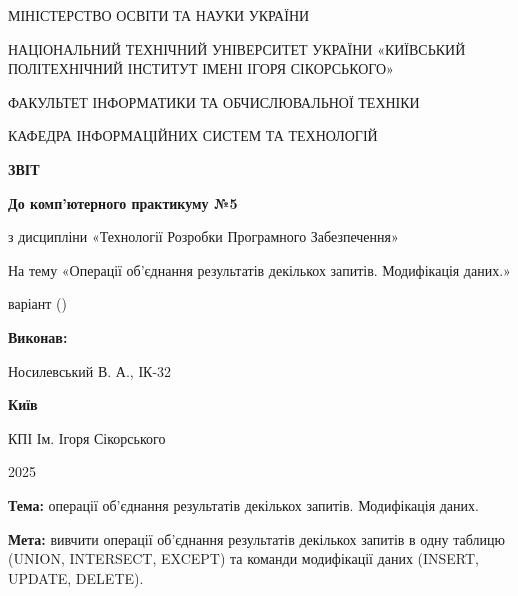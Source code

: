 \documentclass{article}
\begin{document}
    \begin{titlepage}
        \begin{center}
            {\Large
                МІНІСТЕРСТВО ОСВІТИ ТА НАУКИ УКРАЇНИ

                НАЦІОНАЛЬНИЙ ТЕХНІЧНИЙ УНІВЕРСИТЕТ УКРАЇНИ
                «КИЇВСЬКИЙ ПОЛІТЕХНІЧНИЙ ІНСТИТУТ ІМЕНІ ІГОРЯ СІКОРСЬКОГО»

                ФАКУЛЬТЕТ ІНФОРМАТИКИ ТА ОБЧИСЛЮВАЛЬНОЇ ТЕХНІКИ

                КАФЕДРА ІНФОРМАЦІЙНИХ СИСТЕМ ТА ТЕХНОЛОГІЙ
            }


            \vspace{60mm}
            {\large
                \textbf{ЗВІТ}

                \vspace{5mm}

                \textbf{До комп'ютерного практикуму №5}

                \vspace{5mm}

                з дисципліни «Технології Розробки Програмного Забезпечення»
            }

            На тему «Операції об’єднання результатів декількох запитів. Модифікація даних.»

            варіант  ()
        \end{center}

        \vfill
        \hfill
        \begin{minipage}[t]{0.35\textwidth}
            \textbf{Виконав:}

            Носилевський В. А., ІК-32
        \end{minipage}

        \vfill

        \begin{center}
            {\bf
                Київ

                КПІ Ім. Ігоря Сікорського

                2025
            }
        \end{center}
    \end{titlepage}
    \newpage

    \textbf{Тема:} операції об’єднання результатів декількох запитів. Модифікація даних.

    \textbf{Мета:} вивчити операції об’єднання результатів декількох запитів в одну таблицю (UNION, INTERSECT, EXCEPT) та команди модифікації даних (INSERT, UPDATE, DELETE).
\end{document}
